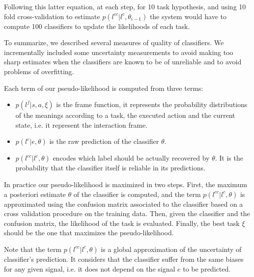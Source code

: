 Following this latter equation, at each step, for 10 task hypothesis, and using 10 fold cross-validation to estimate $p(l^{cc} | l^c, \theta_{i-1})$ the system would have to compute 100 classifiers to update the likelihoods of each task.

\transition

To summarize, we described several measures of quality of classifiers. We incrementally included some uncertainty measurements to avoid making too sharp estimates when the classifiers are known to be of unreliable and to avoid problems of overfitting.


Each term of our pseudo-likelihood is computed from three terms: 
\begin{itemize}
\item $p(l^f|s,a,\xi)$ is the frame function, it represents the probability distributions of the meanings according to a task, the executed action and the current state, i.e. it represent the interaction frame. 
\item $p(l^c | e, \theta)$ is the raw prediction of the classifier $\theta$. 
\item $p(l^{cc} | l^c, \theta)$ encodes which label should be actually recovered by $\theta$. It is the probability that the classifier itself is reliable in its predictions. 
\end{itemize}

In practice our pseudo-likelihood is maximized in two steps. First, the maximum a posteriori estimate $\theta$ of the classifier is computed, and the term $p(l^{cc} | l^c, \theta)$ is approximated using the confusion matrix associated to the classifier based on a cross validation procedure on the training data. Then, given the classifier and the confusion matrix, the likelihood of the task is evaluated. Finally, the best task $\xi$ should be the one that maximizes the pseudo-likelihood.


Note that the term $p(l^{cc} | l^c, \theta)$ is a global approximation of the uncertainty of classifier's prediction. It considers that the classifier suffer from the same biases for any given signal, i.e. it does not depend on the signal $e$ to be predicted.


